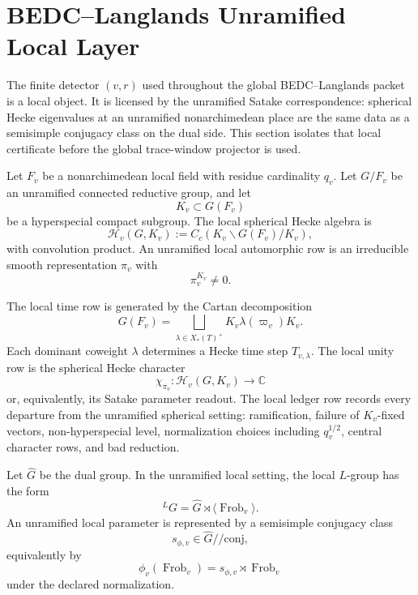 \section{BEDC--Langlands Unramified Local Layer}
\label{sec:unified-reality-bedc-langlands-unramified-local-layer}

The finite detector $(v,r)$ used throughout the global
BEDC--Langlands packet is a local object. It is licensed by the
unramified Satake correspondence: spherical Hecke eigenvalues at an
unramified nonarchimedean place are the same data as a semisimple
conjugacy class on the dual side. This section isolates that local
certificate before the global trace-window projector is used.

\begin{definition}
\label{def:unified-reality-unramified-local-spherical-datum}
Let $F_v$ be a nonarchimedean local field with residue cardinality
$q_v$. Let $G/F_v$ be an unramified connected reductive group, and let
$$
K_v\subset G(F_v)
$$
be a hyperspecial compact subgroup. The local spherical Hecke algebra is
$$
\mathcal H_v(G,K_v)
:=
C_c(K_v\backslash G(F_v)/K_v),
$$
with convolution product. An unramified local automorphic row is an
irreducible smooth representation $\pi_v$ with
$$
\pi_v^{K_v}\ne0.
$$
\end{definition}

\begin{definition}
\label{def:unified-reality-local-bedc-rows}
The local time row is generated by the Cartan decomposition
$$
G(F_v)
=
\bigsqcup_{\lambda\in X_\ast(T)^+}
K_v\lambda(\varpi_v)K_v.
$$
Each dominant coweight $\lambda$ determines a Hecke time step
$T_{v,\lambda}$. The local unity row is the spherical Hecke character
$$
\chi_{\pi_v}:\mathcal H_v(G,K_v)\to\mathbb C
$$
or, equivalently, its Satake parameter readout. The local ledger row
records every departure from the unramified spherical setting:
ramification, failure of $K_v$-fixed vectors, non-hyperspecial level,
normalization choices including $q_v^{1/2}$, central character rows, and
bad reduction.
\end{definition}

\begin{definition}
\label{def:unified-reality-unramified-local-parameter}
Let $\widehat G$ be the dual group. In the unramified local setting, the
local $L$-group has the form
$$
{}^LG=\widehat G\rtimes\langle\operatorname{Frob}_v\rangle.
$$
An unramified local parameter is represented by a semisimple conjugacy
class
$$
s_{\phi,v}\in\widehat G/\!/\mathrm{conj},
$$
equivalently by
$$
\phi_v(\operatorname{Frob}_v)
=
s_{\phi,v}\rtimes\operatorname{Frob}_v
$$
under the declared normalization.
\end{definition}


